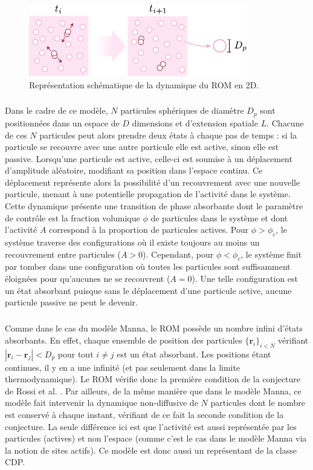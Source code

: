 \begin{figure}[h]
\centering
\includegraphics[width=0.85\textwidth]{Chapitre1/Figures/CDP/ROM.pdf}
\caption{Représentation schématique de la dynamique du ROM en 2D.}
\label{fig:ROM}
\end{figure}

\subparagraph{}Dans le cadre de ce modèle, $N$ particules sphériques de diamètre $D_p$ sont positionnées dans un espace de $D$ dimensions et d'extension spatiale $L$. Chacune de ces $N$ particules peut alors prendre deux états à chaque pas de temps : si la particule se recouvre avec une autre particule elle est active, sinon elle est passive. Lorsqu'une particule est active, celle-ci est soumise à un déplacement d'amplitude aléatoire, modifiant sa position dans l'espace continu. Ce déplacement représente alors la possibilité d'un recouvrement avec une nouvelle particule, menant à une potentielle propagation de l'activité dans le système. Cette dynamique présente une transition de phase absorbante dont le paramètre de contrôle est la fraction volumique $\phi$ de particules dans le système et dont l'activité $A$ correspond à la proportion de particules actives. Pour $\phi>\phi_c$, le système traverse des configurations où il existe toujours au moins un recouvrement entre particules ($A>0$). Cependant, pour $\phi<\phi_c$, le système finit par tomber dans une configuration où toutes les particules sont suffisamment éloignées pour qu'aucunes ne se recouvrent ($A=0$). Une telle configuration est un état absorbant puisque sans le déplacement d'une particule active, aucune particule passive ne peut le devenir. 

\subparagraph{}Comme dans le cas du modèle Manna, le ROM possède un nombre infini d'états absorbants. En effet, chaque ensemble de position des particules $\{\mathbf{r}_i\}_{i<N}$ vérifiant $|\mathbf{r}_i-\mathbf{r}_j|<D_p$ pour tout $i\neq j$ est un état absorbant. Les positions étant continues, il y en a une infinité (et pas seulement dans la limite thermodynamique). Le ROM vérifie donc la première condition de la conjecture de Rossi et al. \cite{rossi_universality_2000}. Par ailleurs, de la même manière que dans le modèle Manna, ce modèle fait intervenir la dynamique non-diffusive de $N$ particules dont le nombre est conservé à chaque instant, vérifiant de ce fait la seconde condition de la conjecture. La seule différence ici est que l'activité est aussi représentée par les particules (actives) et non l'espace (comme c'est le cas dans le modèle Manna via la notion de sites actifs). Ce modèle est donc aussi un représentant de la classe CDP.

